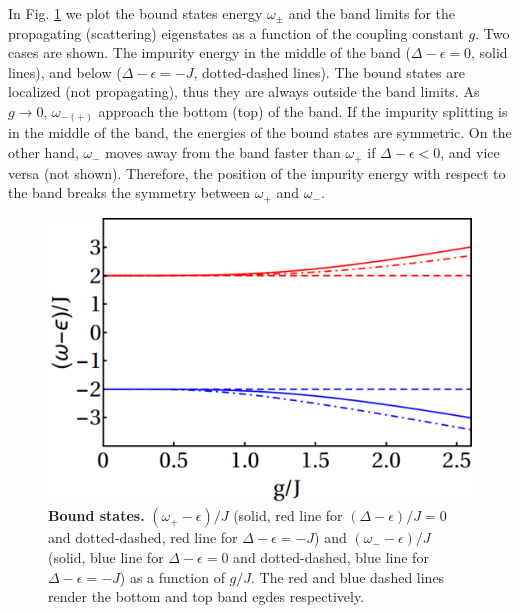 \documentclass[aps,pra,twocolumn,floatfix,superscriptaddress]{revtex4-1}%
\begin{document}
In Fig. \ref{fig:E_bound}  we plot the bound states energy $\omega_\pm$ and the band limits for the propagating (scattering) eigenstates as a function of the coupling constant $g$.
Two cases are shown.  The   impurity energy in the middle of the band ($\Delta-\epsilon=0$, solid lines), and below  ($\Delta-\epsilon=-J$, dotted-dashed lines). 
The bound states are localized (not propagating), thus they are always outside the band limits.
As $g\to 0$, $\omega_{-(+)}$   approach the bottom (top) of the band.
If  the impurity splitting  is in the middle of the band, the energies of the bound states are  symmetric.
On the other hand, $\omega_-$ moves away from the band faster than $\omega_+$ if $\Delta-\epsilon<0$, and vice versa (not shown). Therefore, the position of the impurity energy with respect to the band breaks the symmetry between $\omega_+$ and $\omega_-$.

\begin{figure}[thb!]
\includegraphics[width=1\columnwidth]{E_bound_all.pdf}
\caption{{\bf Bound states.} $(\omega_+-\epsilon)/J$ (solid, red line for $(\Delta-\epsilon)/J=0$ and dotted-dashed, red line for $\Delta-\epsilon=-J$) and $(\omega_--\epsilon)/J$ (solid, blue line for $\Delta-\epsilon=0$ and dotted-dashed, blue line for $\Delta-\epsilon=-J$) as a function of $g/J$. The red and blue dashed lines render the bottom and top band egdes respectively.}\label{fig:E_bound}
\end{figure}
 

\end{document}
